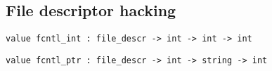\subsection*{File descriptor hacking }\begin{verbatim}
value fcntl_int : file_descr -> int -> int -> int
\end{verbatim}
%
\begin{comment}
 Interface to \verbfcntl in the case where the argument is an
           integer. The first integer argument is the command code;
           the second is the integer parameter. 
\end{comment}
\begin{verbatim}
value fcntl_ptr : file_descr -> int -> string -> int
\end{verbatim}
%
\begin{comment}
 Interface to \verbfcntl in the case where the argument is a pointer.
           The integer argument is the command code. A pointer to the string
           argument is passed as argument to the command. The string argument
           is usually set up with the functions from modules \verbpeek and
           \verbpoke. 
\end{comment}
